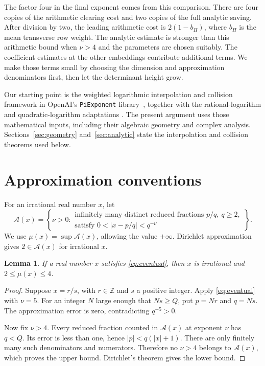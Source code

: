 \documentclass[11pt]{article}
\newtheorem{lemma}[theorem]{Lemma}
\theoremstyle{definition}
\theoremstyle{remark}
\theoremstyle{plain}
\newcommand{\Z}{\mathbb Z}
\begin{document}
The factor four in the final exponent comes from this comparison. There
are four copies of the arithmetic clearing cost and two copies of the full
analytic saving. After division by two, the leading arithmetic cost is
\(2(1-b_H)\), where \(b_H\) is the mean transverse row weight. The
analytic estimate is stronger than this arithmetic bound when \(\nu>4\)
and the parameters are chosen suitably. The coefficient estimates at the
other embeddings contribute additional terms. We make those terms small
by choosing the dimension and approximation denominators first, then let
the determinant height grow.

Our starting point is the weighted logarithmic interpolation and collision
framework in OpenAI's \texttt{PiExponent} library~\cite{openai}, together
with the rational-logarithm and quadratic-logarithm adaptations
\cite{rational,quadratic}. The present argument uses those mathematical
inputs, including their algebraic geometry and complex analysis.
Sections~\ref{sec:geometry} and~\ref{sec:analytic} state the interpolation
and collision theorems used below.

\section{Approximation conventions}\label{sec:conventions}
For an irrational real number \(x\), let
\[
 \mathcal A(x)=\left\{\nu>0:
 \begin{array}{l}
 \text{infinitely many distinct reduced fractions }p/q,\ q\ge2,\\[-2pt]
 \text{satisfy }0<|x-p/q|<q^{-\nu}
 \end{array}\right\}.
\]
We use \(\mu(x)=\sup\mathcal A(x)\), allowing the value \(+\infty\).
Dirichlet approximation
gives \(2\in\mathcal A(x)\) for irrational \(x\).

\begin{lemma}\label{lem:exponent}
If a real number \(x\) satisfies \eqref{eq:eventual}, then \(x\) is
irrational and \(2\le\mu(x)\le4\).
\end{lemma}
\begin{proof}
Suppose \(x=r/s\), with \(r\in\Z\) and \(s\) a positive integer.
Apply \eqref{eq:eventual} with \(\nu=5\). For an integer \(N\)
large enough that \(Ns\ge Q\), put \(p=Nr\) and \(q=Ns\).
The approximation error is zero, contradicting \(q^{-5}>0\).

Now fix \(\nu>4\). Every reduced fraction counted in
\(\mathcal A(x)\) at exponent \(\nu\) has \(q<Q\). Its error is
less than one, hence \(|p|<q(|x|+1)\). There are only finitely many
such denominators and numerators. Therefore no \(\nu>4\) belongs to
\(\mathcal A(x)\), which proves the upper bound. Dirichlet's theorem
gives the lower bound.
\end{proof}
\end{document}
